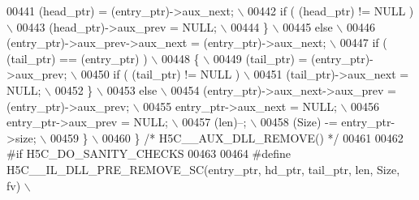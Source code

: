 \begin{DoxyCode}
00441 \textcolor{preprocessor}{          (head\_ptr) = (entry\_ptr)->aux\_next;                                \(\backslash\)}
00442 \textcolor{preprocessor}{          if ( (head\_ptr) != NULL )                                          \(\backslash\)}
00443 \textcolor{preprocessor}{             (head\_ptr)->aux\_prev = NULL;                                    \(\backslash\)}
00444 \textcolor{preprocessor}{       \}                                                                     \(\backslash\)}
00445 \textcolor{preprocessor}{       else                                                                  \(\backslash\)}
00446 \textcolor{preprocessor}{          (entry\_ptr)->aux\_prev->aux\_next = (entry\_ptr)->aux\_next;           \(\backslash\)}
00447 \textcolor{preprocessor}{       if ( (tail\_ptr) == (entry\_ptr) )                                      \(\backslash\)}
00448 \textcolor{preprocessor}{       \{                                                                     \(\backslash\)}
00449 \textcolor{preprocessor}{          (tail\_ptr) = (entry\_ptr)->aux\_prev;                                \(\backslash\)}
00450 \textcolor{preprocessor}{          if ( (tail\_ptr) != NULL )                                          \(\backslash\)}
00451 \textcolor{preprocessor}{             (tail\_ptr)->aux\_next = NULL;                                    \(\backslash\)}
00452 \textcolor{preprocessor}{       \}                                                                     \(\backslash\)}
00453 \textcolor{preprocessor}{       else                                                                  \(\backslash\)}
00454 \textcolor{preprocessor}{          (entry\_ptr)->aux\_next->aux\_prev = (entry\_ptr)->aux\_prev;           \(\backslash\)}
00455 \textcolor{preprocessor}{       entry\_ptr->aux\_next = NULL;                                           \(\backslash\)}
00456 \textcolor{preprocessor}{       entry\_ptr->aux\_prev = NULL;                                           \(\backslash\)}
00457 \textcolor{preprocessor}{       (len)--;                                                              \(\backslash\)}
00458 \textcolor{preprocessor}{       (Size) -= entry\_ptr->size;                                            \(\backslash\)}
00459 \textcolor{preprocessor}{    \}                                                                        \(\backslash\)}
00460 \textcolor{preprocessor}{\} }\textcolor{comment}{/* H5C\_\_AUX\_DLL\_REMOVE() */}\textcolor{preprocessor}{}
00461 
00462 \textcolor{preprocessor}{#if H5C\_DO\_SANITY\_CHECKS}
00463 
00464 \textcolor{preprocessor}{#define H5C\_\_IL\_DLL\_PRE\_REMOVE\_SC(entry\_ptr, hd\_ptr, tail\_ptr, len, Size, fv) \(\backslash\)}

\end{DoxyCode}
